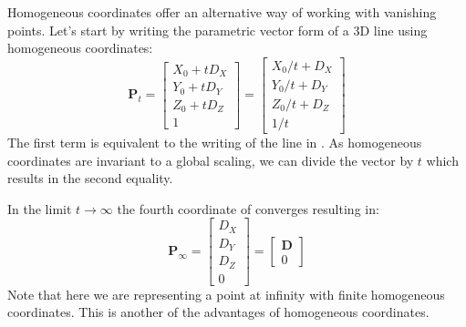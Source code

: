 

Homogeneous coordinates offer an alternative way of working with vanishing points. Let's start by writing the parametric vector form of a 3D line using homogeneous coordinates:
\begin{equation}
\mathbf{P}_t = 
    \begin{bmatrix}
    X_0 + t D_X\\
    Y_0 + t D_Y\\
    Z_0 + t D_Z\\
    1
    \end{bmatrix}
    =
    \begin{bmatrix}
    X_0/t + D_X\\
    Y_0 /t+ D_Y\\
    Z_0/t + D_Z\\
    1/t
    \end{bmatrix}
\label{eq:parametric_vector_line_homogeneous}
\end{equation}
The first term is equivalent to the writing of the line in \eqn{\ref{eq:parametric_vector_line}}. As homogeneous coordinates are invariant to a global scaling, we can divide the vector by $t$ which results in the second equality.

In the limit $t \to \infty$ the fourth coordinate of \eqn{\ref{eq:parametric_vector_line_homogeneous}} converges resulting in:
\begin{equation}
    \mathbf{P}_\infty = 
    \begin{bmatrix}
    D_X\\
    D_Y\\
    D_Z\\
    0
    \end{bmatrix}
    = 
    \begin{bmatrix}
    \mathbf{D}\\
    0
    \end{bmatrix}
\end{equation}
Note that here we are representing a point at infinity with finite homogeneous coordinates. This is another of the advantages of homogeneous coordinates.  

